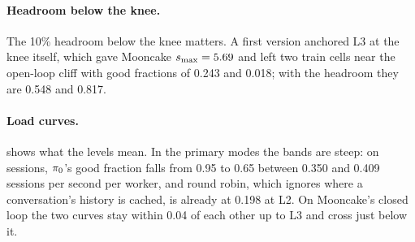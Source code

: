 \paragraph{Headroom below the knee.}
The 10\% headroom below the knee matters. A first version anchored L3 at the knee itself, which
gave Mooncake $s_{\max} = 5.69$ and left two train cells near the open-loop cliff with good
fractions of 0.243 and 0.018; with the headroom they are 0.548 and 0.817.

\paragraph{Load curves.}
 shows what the levels mean. In the primary modes the bands are steep: on
sessions, $\pi_{0}$'s good fraction falls from 0.95 to 0.65 between 0.350 and 0.409 sessions per
second per worker, and round robin, which ignores where a conversation's history is cached, is
already at 0.198 at L2. On Mooncake's closed loop the two curves stay within 0.04 of each other
up to L3 and cross just below it.

\newcommand{\simLevelLines}[3]{%
  \draw[black!35, thin] (axis cs:#1,0) -- (axis cs:#1,1.03);
  \draw[black!35, thin] (axis cs:#2,0) -- (axis cs:#2,1.03);
  \draw[black!35, thin] (axis cs:#3,0) -- (axis cs:#3,1.03);}

